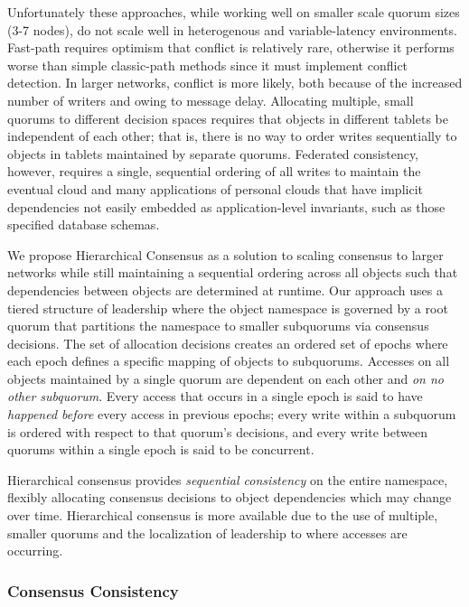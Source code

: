 \documentclass{article}
\begin{document}
Unfortunately these approaches, while working well on smaller scale quorum sizes (3-7 nodes), do not scale well in heterogenous and variable-latency environments. Fast-path requires optimism that conflict is relatively rare, otherwise it performs worse than simple classic-path methods since it must implement conflict detection. In larger networks, conflict is more likely, both because of the increased number of writers and owing to message delay. Allocating multiple, small quorums to different decision spaces requires that objects in different tablets be independent of each other; that is, there is no way to order writes sequentially to objects in tablets maintained by separate quorums. Federated consistency, however, requires a single, sequential ordering of all writes to maintain the eventual cloud and many applications of personal clouds that have implicit dependencies not easily embedded as application-level invariants, such as those specified database schemas.

We propose Hierarchical Consensus as a solution to scaling consensus to larger networks while still maintaining a sequential ordering across all objects such that dependencies between objects are determined at runtime. Our approach uses a tiered structure of leadership where the object namespace is governed by a root quorum that partitions the namespace to smaller subquorums via consensus decisions. The set of allocation decisions creates an ordered set of epochs where each epoch defines a specific mapping of objects to subquorums. Accesses on all objects maintained by a single quorum are dependent on each other and \textit{on no other subquorum}. Every access that occurs in a single epoch is said to have \textit{happened before} every access in previous epochs; every write within a subquorum is ordered with respect to that quorum's decisions, and every write between quorums within a single epoch is said to be concurrent.

Hierarchical consensus provides \textit{sequential consistency} on the entire namespace, flexibly allocating consensus decisions to object dependencies which may change over time. Hierarchical consensus is more available due to the use of multiple, smaller quorums and the localization of leadership to where accesses are occurring.

\subsubsection{Consensus Consistency}
\end{document}
